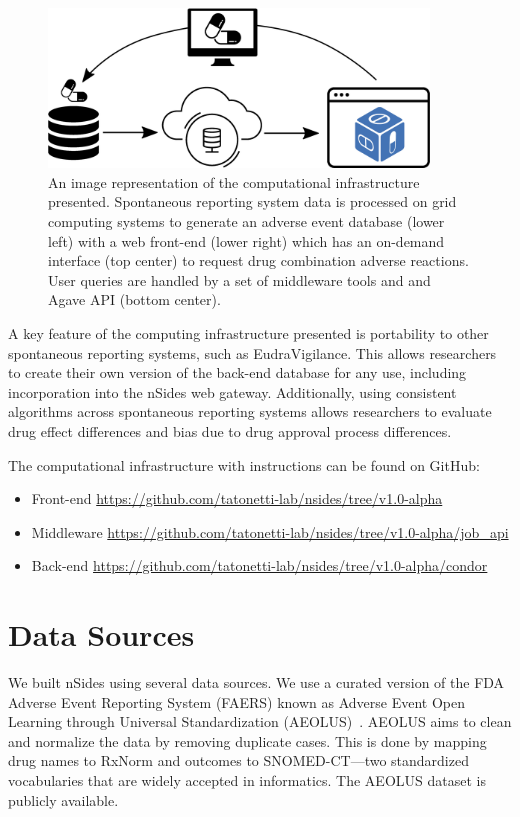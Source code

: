 \documentclass{ws-procs11x85}
\begin{document}
\begin{figure}[h]
\centerline{\includegraphics[width=0.9\textwidth]{workflow}}
\caption{An image representation of the computational infrastructure
  presented. Spontaneous reporting system data is processed on grid
  computing systems to generate an adverse event database (lower left) with a web
  front-end (lower right) which has an on-demand interface (top center) to request drug
  combination adverse reactions. User queries are handled by a set of middleware tools and and Agave API (bottom center).}
\label{fig:workflow}
\end{figure}

A key feature of the computing infrastructure presented is portability
to other spontaneous reporting systems, such as EudraVigilance.  This
allows researchers to create their own version of the back-end
database for any use, including incorporation into the nSides web
gateway. Additionally, using consistent algorithms across
spontaneous reporting systems allows researchers to evaluate drug
effect differences and bias due to drug approval process differences.

The computational infrastructure with instructions can be found on
GitHub:
\begin{itemize}
\item Front-end \url{https://github.com/tatonetti-lab/nsides/tree/v1.0-alpha}
\item Middleware \url{https://github.com/tatonetti-lab/nsides/tree/v1.0-alpha/job_api}
\item Back-end \url{https://github.com/tatonetti-lab/nsides/tree/v1.0-alpha/condor}
\end{itemize}


\section{Data Sources}

We built nSides using several data sources. We use a
curated version of the FDA Adverse Event Reporting System (FAERS)
known as Adverse Event Open Learning through Universal Standardization
(AEOLUS)~\cite{AEOLUS}.  AEOLUS aims to clean and normalize the data
by removing duplicate cases. This is done by mapping drug names to RxNorm and outcomes to SNOMED-CT---two standardized vocabularies that are widely accepted in informatics. The AEOLUS dataset is publicly available.
\end{document}
